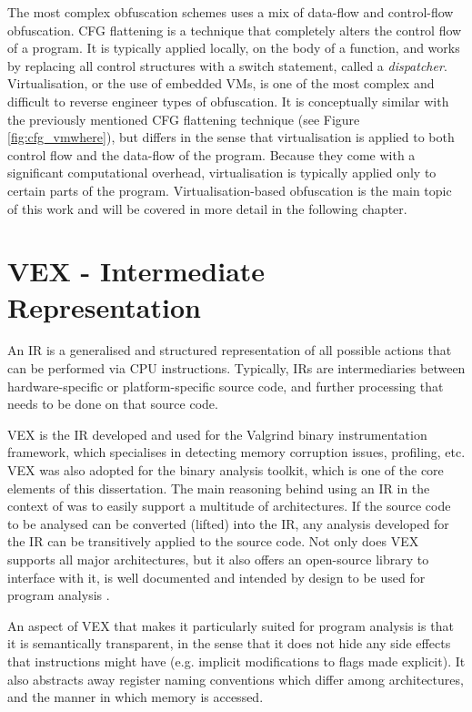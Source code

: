 The most complex obfuscation schemes uses a mix of data-flow and control-flow obfuscation. \gls{CFG} flattening is a technique that completely alters the control flow of a program. It is typically applied locally, on the body of a function, and works by replacing all control structures with a switch statement, called a \emph{dispatcher}. Virtualisation, or the use of embedded \glspl{VM}, is one of the most complex and difficult to reverse engineer types of obfuscation. It is conceptually similar with the previously mentioned \gls{CFG} flattening technique (see Figure \ref{fig:cfg_vmwhere}), but differs in the sense that virtualisation is applied to both control flow and the data-flow of the program. Because they come with a significant computational overhead, virtualisation is typically applied only to certain parts of the program. Virtualisation-based obfuscation is the main topic of this work and will be covered in more detail in the following chapter.

\section{VEX - Intermediate Representation}
\label{sec:vex}

An \gls{IR} is a generalised and structured representation of all possible actions that can be performed via \gls{CPU} instructions. Typically, \glspl{IR} are intermediaries between hardware-specific or platform-specific source code, and further processing that needs to be done on that source code.

VEX is the \gls{IR} developed and used for the Valgrind \cite{valgrind} binary instrumentation framework, which specialises in detecting memory corruption issues, profiling, etc. VEX was also adopted for the  \cite{angr} binary analysis toolkit, which is one of the core elements of this dissertation. The main reasoning behind using an \gls{IR} in the context of  was to easily support a multitude of architectures. If the source code to be analysed can be converted (lifted) into the \gls{IR}, any analysis developed for the \gls{IR} can be transitively applied to the source code. Not only does VEX supports all major architectures, but it also offers an open-source library to interface with it, is well documented and intended by design to be used for program analysis \cite{why_vex}. 

An aspect of VEX that makes it particularly suited for program analysis is that it is semantically transparent, in the sense that it does not hide any side effects that instructions might have (e.g. implicit modifications to flags made explicit). It also abstracts away register naming conventions which differ among architectures, and the manner in which memory is accessed. \cite{angr_ir} 

